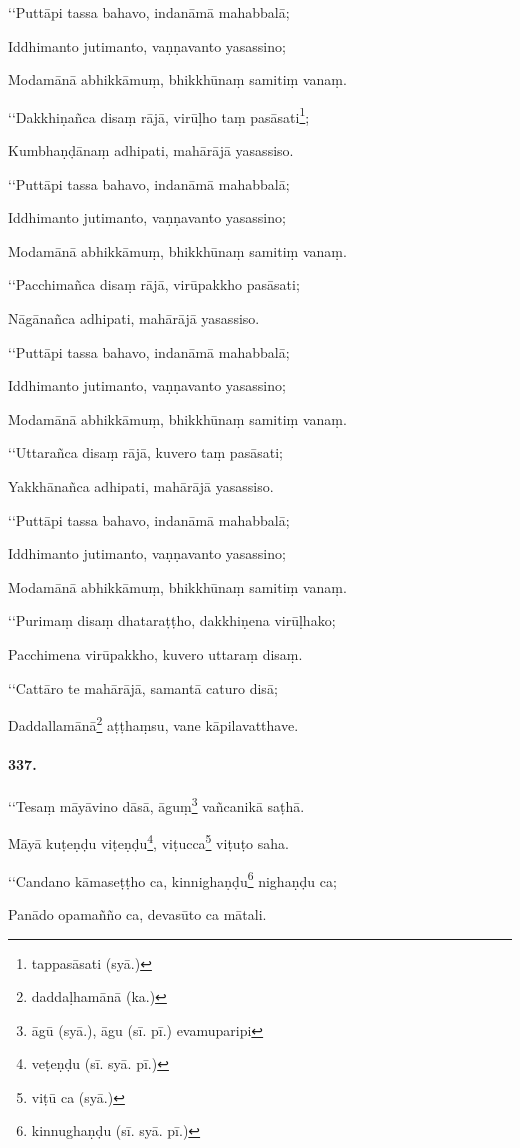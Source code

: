 ‘‘Puttāpi tassa bahavo, indanāmā mahabbalā;

Iddhimanto jutimanto, vaṇṇavanto yasassino;

Modamānā abhikkāmuṃ, bhikkhūnaṃ samitiṃ vanaṃ.

‘‘Dakkhiṇañca disaṃ rājā, virūḷho taṃ pasāsati\footnote{tappasāsati (syā.)};

Kumbhaṇḍānaṃ adhipati, mahārājā yasassiso.

‘‘Puttāpi tassa bahavo, indanāmā mahabbalā;

Iddhimanto jutimanto, vaṇṇavanto yasassino;

Modamānā abhikkāmuṃ, bhikkhūnaṃ samitiṃ vanaṃ.

‘‘Pacchimañca disaṃ rājā, virūpakkho pasāsati;

Nāgānañca adhipati, mahārājā yasassiso.

‘‘Puttāpi tassa bahavo, indanāmā mahabbalā;

Iddhimanto jutimanto, vaṇṇavanto yasassino;

Modamānā abhikkāmuṃ, bhikkhūnaṃ samitiṃ vanaṃ.

‘‘Uttarañca disaṃ rājā, kuvero taṃ pasāsati;

Yakkhānañca adhipati, mahārājā yasassiso.

‘‘Puttāpi tassa bahavo, indanāmā mahabbalā;

Iddhimanto jutimanto, vaṇṇavanto yasassino;

Modamānā abhikkāmuṃ, bhikkhūnaṃ samitiṃ vanaṃ.

‘‘Purimaṃ disaṃ dhataraṭṭho, dakkhiṇena virūḷhako;

Pacchimena virūpakkho, kuvero uttaraṃ disaṃ.

‘‘Cattāro te mahārājā, samantā caturo disā;

Daddallamānā\footnote{daddaḷhamānā (ka.)} aṭṭhaṃsu, vane kāpilavatthave.

\paragraph{337.}‘‘Tesaṃ māyāvino dāsā, āguṃ\footnote{āgū (syā.), āgu (sī. pī.) evamuparipi} vañcanikā saṭhā.

Māyā kuṭeṇḍu viṭeṇḍu\footnote{veṭeṇḍu (sī. syā. pī.)}, viṭucca\footnote{viṭū ca (syā.)} viṭuṭo saha.

‘‘Candano kāmaseṭṭho ca, kinnighaṇḍu\footnote{kinnughaṇḍu (sī. syā. pī.)} nighaṇḍu ca;

Panādo opamañño ca, devasūto ca mātali.


